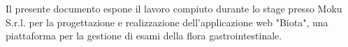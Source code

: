 
Il presente documento espone il lavoro compiuto durante lo stage presso Moku S.r.l. per la progettazione e realizzazione dell'applicazione web "Biota", una piattaforma per la gestione di esami della flora gastrointestinale.